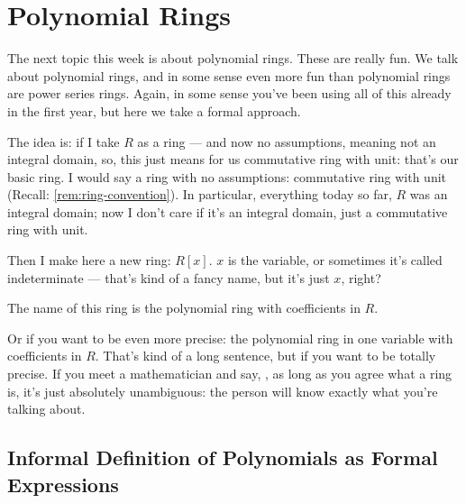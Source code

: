 \section{Polynomial Rings}

\begin{speech}[01:16:00 - 01:18:05]
The next topic this week is about polynomial rings. These are really fun.  We talk about polynomial rings, and in some sense even more fun than polynomial rings are power series rings. Again, in some sense you've been using all of this already in the first year, but here we take a formal approach.

The idea is: if I take $R$ as a ring  --- and now no assumptions, meaning not an integral domain, so, this just means for us commutative ring with unit:  that's our basic ring. I would say a ring with no assumptions: commutative ring with unit (Recall: \cref{rem:ring-convention}). In particular, everything today so far, $R$ was an integral domain; now I don't care if it's an integral domain, just a commutative ring with unit.

Then I make here a new ring: $R[x]$.  $x$ is the variable, or sometimes it's called indeterminate  --- that's kind of a fancy name, but it's just $x$, right? 

The name of this ring is the polynomial ring with coefficients in $R$. 

Or if you want to be even more precise: the polynomial ring in one variable with coefficients in $R$. That's kind of a long sentence, but if you want to be totally precise. If you meet a mathematician and say, , as long as you agree what a ring is, it's just absolutely unambiguous: the person will know exactly what you're talking about.
\end{speech}

\subsection{Informal Definition of Polynomials as Formal Expressions}

